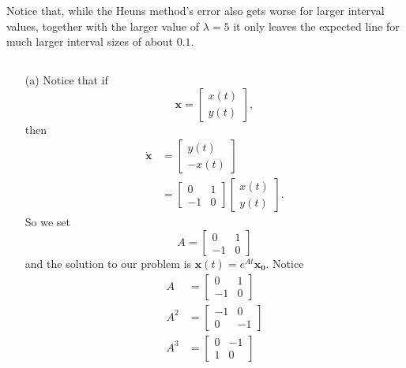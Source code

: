 \documentclass{article}
\begin{document}
\begin{itemize}
\begin{figure}[H]
		\end{figure}
		Notice that, while the Heuns method's error also gets worse for
		larger interval values, together with the larger value of
		$\lambda = 5$ it
		only leaves the expected line for
		much larger interval sizes of about $0.1$.
\end{itemize}

\subsection{}
\begin{itemize}
	\item[(a)]
		Notice that if
		\[
			\mathbf{x} =
			\begin{bmatrix}
				x(t) \\
				y(t)
			\end{bmatrix},
		\]
		then
		\begin{align*}
			\mathbf{\dot{x}} &=
			\begin{bmatrix}
				 y(t) \\
				-x(t)
			\end{bmatrix} \\
			&= \begin{bmatrix}
				 0 & 1 \\
				-1 & 0
			\end{bmatrix}
			\begin{bmatrix}
				x(t) \\
				y(t)
			\end{bmatrix}.
		\end{align*}
		So we set
		\[
			A =
			\begin{bmatrix}
				 0 & 1 \\
				-1 & 0
			\end{bmatrix}
		\]
		and the solution to our problem is $\mathbf{x}(t) =
		e^{At}\mathbf{x_0}$.  Notice
		\begin{align*}
			A &=
			\begin{bmatrix}
				 0 &  1 \\
				-1 &  0
			\end{bmatrix} \\
			A^2 &=
			\begin{bmatrix}
				-1 &  0 \\
				 0 & -1
			\end{bmatrix} \\
			A^3 &=
			\begin{bmatrix}
				 0 & -1 \\
				 1 &  0
			\end{bmatrix} \\

\end{align*}
\end{itemize}
\end{document}
